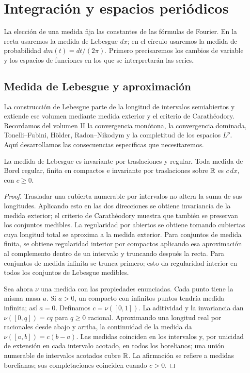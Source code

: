 \chapter{Integración y espacios periódicos}\label{cap:v4-02}
La elección de una medida fija las constantes de las fórmulas de Fourier. En la recta usaremos la medida de Lebesgue $dx$; en el círculo usaremos la medida de probabilidad $dm(t)=dt/(2\pi)$. Primero precisaremos los cambios de variable y los espacios de funciones en los que se interpretarán las series.

\section{Medida de Lebesgue y aproximación}\label{lectura:v4-02}
La construcción de Lebesgue parte de la longitud de intervalos semiabiertos y extiende ese volumen mediante medida exterior y el criterio de Carathéodory. Recordamos del volumen II la convergencia monótona, la convergencia dominada, Tonelli--Fubini, Hölder, Radon--Nikodym y la completitud de los espacios $L^p$. Aquí desarrollamos las consecuencias específicas que necesitaremos.
\begin{proposicion}
La medida de Lebesgue es invariante por traslaciones y regular. Toda medida de Borel regular, finita en compactos e invariante por traslaciones sobre $\mathbb R$ es $c\,dx$, con $c\geq0$.
\end{proposicion}
\begin{proof}
Trasladar una cubierta numerable por intervalos no altera la suma de sus longitudes. Aplicando esto en las dos direcciones se obtiene invariancia de la medida exterior; el criterio de Carathéodory muestra que también se preservan los conjuntos medibles. La regularidad por abiertos se obtiene tomando cubiertas cuya longitud total se aproxima a la medida exterior. Para conjuntos de medida finita, se obtiene regularidad interior por compactos aplicando esa aproximación al complemento dentro de un intervalo y truncando después la recta. Para conjuntos de medida infinita se trunca primero; esto da regularidad interior en todos los conjuntos de Lebesgue medibles.

Sea ahora $\nu$ una medida con las propiedades enunciadas. Cada punto tiene la misma masa $a$. Si $a>0$, un compacto con infinitos puntos tendría medida infinita; así $a=0$. Definamos $c=\nu([0,1])$. La aditividad y la invariancia dan $\nu([0,q])=cq$ para $q\geq0$ racional. Aproximando una longitud real por racionales desde abajo y arriba, la continuidad de la medida da $\nu([a,b])=c(b-a)$. Las medidas coinciden en los intervalos y, por unicidad de extensión en cada intervalo acotado, en todos los borelianos; una unión numerable de intervalos acotados cubre $\mathbb R$. La afirmación se refiere a medidas borelianas; sus completaciones coinciden cuando $c>0$.
\end{proof}
